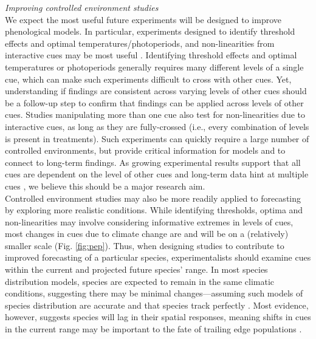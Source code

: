 \documentclass[11pt,letter]{article}
\begin{document}
\emph{Improving controlled environment studies}\\
We expect the most useful future experiments will be designed to improve phenological models. In particular, experiments designed to identify threshold effects and optimal temperatures/photoperiods, and non-linearities from interactive cues may be most useful \citep{iler2013}. Identifying threshold effects and optimal temperatures or photoperiods generally requires many different levels of a single cue, which can make such experiments difficult to cross with other cues. Yet, understanding if findings are consistent across varying levels of other cues should be a follow-up step to confirm that findings can be applied across levels of other cues. Studies manipulating more than one cue also test for non-linearities due to interactive cues, as long as they are fully-crossed (i.e., every combination of levels is present in treatments). Such experiments can quickly require a large number of controlled environments, but provide critical information for models and to connect to long-term findings. As growing experimental results support that all cues are dependent on the level of other cues \citep{stearns1958,flynn2018} and long-term data hint at multiple cues \citep{fu2015}, we believe this should be a major research aim.\\

Controlled environment studies may also be more readily applied to forecasting by exploring more realistic conditions. While identifying thresholds, optima and non-linearities may involve considering informative extremes in levels of cues, most changes in cues due to climate change are and will be on a (relatively) smaller scale (Fig. \ref{fig:pep}). Thus, when designing studies to contribute to improved forecasting of a particular species, experimentalists should examine cues within the current and projected future species' range. In most species distribution models, species are expected to remain in the same climatic conditions, suggesting there may be minimal changes---assuming such models of species distribution are accurate and that species track perfectly \citep{elith2009species}. Most evidence, however, suggests species will lag in their spatial responses, meaning shifts in cues in the current range may be important to the fate of trailing edge populations \citep{bertrand2011changes,lenoir2015climate,savage2015elevational}. \\ %
\end{document}
